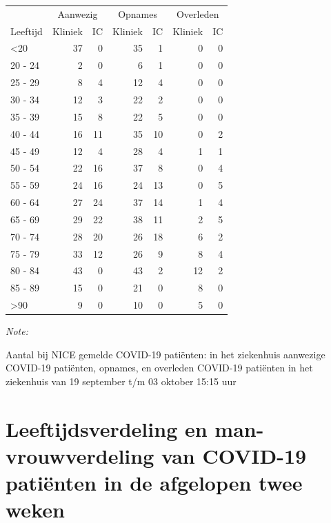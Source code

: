 \documentclass[
  english,
  man,floatsintext]{apa6}
\begin{document}
\begin{table}
\centering\begingroup\fontsize{10}{12}\selectfont

\begin{threeparttable}
\begin{tabular}{lrrrrrr}
\toprule
\multicolumn{1}{c}{ } & \multicolumn{2}{c}{Aanwezig} & \multicolumn{2}{c}{Opnames} & \multicolumn{2}{c}{Overleden} \\
\cmidrule(l{3pt}r{3pt}){2-3} \cmidrule(l{3pt}r{3pt}){4-5} \cmidrule(l{3pt}r{3pt}){6-7}
Leeftijd & Kliniek & IC & Kliniek & IC & Kliniek & IC\\
\midrule
<20 & 37 & 0 & 35 & 1 & 0 & 0\\
20 - 24 & 2 & 0 & 6 & 1 & 0 & 0\\
25 - 29 & 8 & 4 & 12 & 4 & 0 & 0\\
30 - 34 & 12 & 3 & 22 & 2 & 0 & 0\\
35 - 39 & 15 & 8 & 22 & 5 & 0 & 0\\
40 - 44 & 16 & 11 & 35 & 10 & 0 & 2\\
45 - 49 & 12 & 4 & 28 & 4 & 1 & 1\\
50 - 54 & 22 & 16 & 37 & 8 & 0 & 4\\
55 - 59 & 24 & 16 & 24 & 13 & 0 & 5\\
60 - 64 & 27 & 24 & 37 & 14 & 1 & 4\\
65 - 69 & 29 & 22 & 38 & 11 & 2 & 5\\
70 - 74 & 28 & 20 & 26 & 18 & 6 & 2\\
75 - 79 & 33 & 12 & 26 & 9 & 8 & 4\\
80 - 84 & 43 & 0 & 43 & 2 & 12 & 2\\
85 - 89 & 15 & 0 & 21 & 0 & 8 & 0\\
>90 & 9 & 0 & 10 & 0 & 5 & 0\\
\bottomrule
\end{tabular}
\begin{tablenotes}
\item \textit{Note: } 
\item Aantal bij NICE gemelde COVID-19 patiënten: in het ziekenhuis aanwezige COVID-19 patiënten, opnames, en overleden COVID-19 patiënten in het ziekenhuis van 19 september t/m 03 oktober 15:15 uur
\end{tablenotes}
\end{threeparttable}
\endgroup{}
\end{table}

\newpage

\hypertarget{leeftijdsverdeling-en-man-vrouwverdeling-van-covid-19-patiuxebnten-in-de-afgelopen-twee-weken}{%
\section{Leeftijdsverdeling en man-vrouwverdeling van COVID-19 patiënten in de afgelopen twee weken}\label{leeftijdsverdeling-en-man-vrouwverdeling-van-covid-19-patiuxebnten-in-de-afgelopen-twee-weken}}
\end{document}
